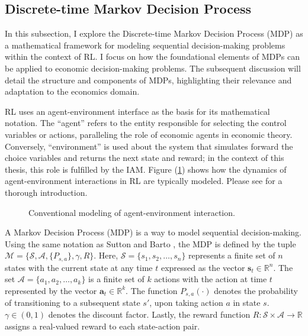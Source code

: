 \subsection{Discrete-time Markov Decision Process}

In this subsection, I explore the Discrete-time Markov Decision Process (MDP) as a mathematical framework for modeling sequential decision-making problems within the context of RL. I focus on how the foundational elements of MDPs can be applied to economic decision-making problems. The subsequent discussion will detail the structure and components of MDPs, highlighting their relevance and adaptation to the economics domain.

RL uses an agent-environment interface as the basis for its mathematical notation. The \enquote{agent} refers to the entity responsible for selecting the control variables or actions, paralleling the role of economic agents in economic theory. Conversely, \enquote{environment} is used about the system that simulates forward the choice variables and returns the next state and reward; in the context of this thesis, this role is fulfilled by the IAM. Figure (\ref{fig:agent-environment interaction}) shows how the dynamics of agent-environment interactions in RL are typically modeled. Please see \textcite[Chapter 3]{Sutton2018intro_to_rl} for a thorough introduction. 

\begin{figure}[]
    \centering
    
    \caption{Conventional modeling of agent-environment interaction.}
    \label{fig:agent-environment interaction}
\end{figure}

A Markov Decision Process (MDP) is a way to model sequential decision-making. Using the same notation as Sutton and Barto \textcite[Chapter 3]{Sutton2018intro_to_rl}, the MDP is defined by the tuple \(\mathcal{M} = \{\mathcal{S}, \mathcal{A}, \{P_{s, a}\}, \gamma, R\}\). Here, \(\mathcal{S}= \{s_1, s_2, \dots, s_n\}\) represents a finite set of \(n\) states with the current state at any time \(t\) expressed as the vector \(\bm{s}_t \in \mathbb{R}^n\). The set \(\mathcal{A} = \{a_1, a_2, \dots, a_k\}\) is a finite set of \(k\) actions with the action at time \(t\) represented by the vector \(\bm{a}_t \in \mathbb{R}^k\). The function \( P_{s, a}(\cdot) \) denotes the probability of transitioning to a subsequent state \(s'\), upon taking action \(a\) in state \(s\). \(\gamma \in (0,1)\) denotes the discount factor. Lastly, the reward function \(R: \mathcal{S} \times \mathcal{A} \rightarrow  \mathbb{R} \) assigns a real-valued reward to each state-action pair.

